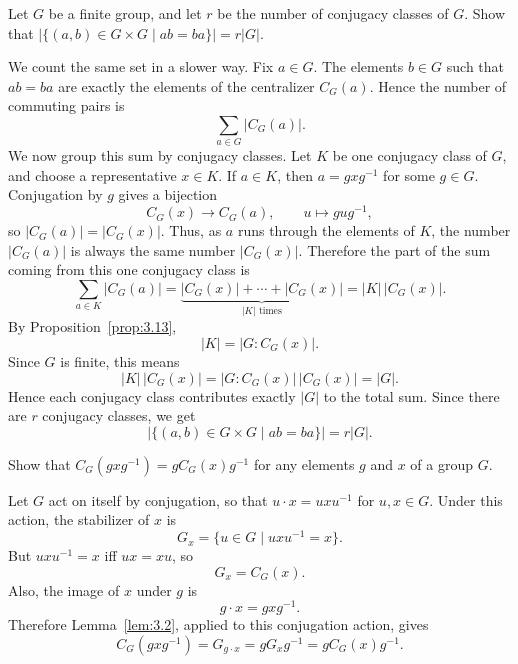 \documentclass[../Odyssey_Project.tex]{subfiles}
\begin{document}
\begin{exercise}
\label{ex:3.6}
Let $G$ be a finite group, and let $r$ be the number of conjugacy classes of $G$. Show that $|\{(a,b) \in G \times G \mid ab = ba\}| = r|G|$.
\end{exercise}
\begin{solution}
    We count the same set in a slower way. Fix $a \in G$. The elements $b \in G$ such that $ab = ba$ are exactly the elements of the centralizer $C_G(a)$. Hence the number of commuting pairs is
    \[
        \sum_{a \in G} |C_G(a)|.
    \]
    We now group this sum by conjugacy classes. Let $K$ be one conjugacy class of $G$, and choose a representative $x \in K$.
    If $a \in K$, then $a = gxg^{-1}$ for some $g \in G$. Conjugation by $g$ gives a bijection
    \[
        C_G(x) \to C_G(a), \qquad u \mapsto gug^{-1},
    \]
    so $|C_G(a)| = |C_G(x)|$. Thus, as $a$ runs through the elements of $K$, the number $|C_G(a)|$ is always the same number $|C_G(x)|$.
    Therefore the part of the sum coming from this one conjugacy class is
    \[
        \sum_{a \in K} |C_G(a)|
        =
        \underbrace{|C_G(x)| + \cdots + |C_G(x)|}_{|K|\text{ times}}
        =
        |K|\,|C_G(x)|.
    \]
    By Proposition~\ref{prop:3.13},
    \[
        |K| = |G : C_G(x)|.
    \]
    Since $G$ is finite, this means
    \[
        |K|\,|C_G(x)|
        =
        |G : C_G(x)|\,|C_G(x)|
        =
        |G|.
    \]
    Hence each conjugacy class contributes exactly $|G|$ to the total sum. Since there are $r$ conjugacy classes, we get
    \[
        |\{(a,b) \in G \times G \mid ab = ba\}|
        =
        r|G|.
    \]
\end{solution}

\begin{exercise}
\label{ex:3.7}
Show that $C_G(gxg^{-1}) = g C_G(x) g^{-1}$ for any elements $g$ and $x$ of a group $G$.
\end{exercise}
\begin{solution}
    Let $G$ act on itself by conjugation, so that $u \cdot x = uxu^{-1}$ for $u,x \in G$.
    Under this action, the stabilizer of $x$ is
    \[
        G_x = \{u \in G \mid uxu^{-1} = x\}.
    \]
    But $uxu^{-1}=x$ iff $ux=xu$, so
    \[
        G_x = C_G(x).
    \]
    Also, the image of $x$ under $g$ is
    \[
        g \cdot x = gxg^{-1}.
    \]
    Therefore Lemma~\ref{lem:3.2}, applied to this conjugation action, gives
    \[
        C_G(gxg^{-1})
        =
        G_{g \cdot x}
        =
        gG_xg^{-1}
        =
        gC_G(x)g^{-1}.
    \]
\end{solution}
\end{document}
